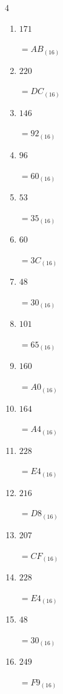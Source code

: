 \begin{multicols}{4}
\begin{enumerate}
        $=3A_{(16)}$

  \item $171$

        $=AB_{(16)}$

  \item $220$

        $=DC_{(16)}$

  \item $146$

        $=92_{(16)}$

\columnbreak %

  \item $96$

        $=60_{(16)}$

  \item $53$

        $=35_{(16)}$

  \item $60$

        $=3C_{(16)}$

  \item $48$

        $=30_{(16)}$

  \item $101$

        $=65_{(16)}$

  \item $160$

        $=A0_{(16)}$

  \item $164$

        $=A4_{(16)}$

  \item $228$

        $=E4_{(16)}$

  \item $216$

        $=D8_{(16)}$

  \item $207$

        $=CF_{(16)}$

  \item $228$

        $=E4_{(16)}$

  \item $48$

        $=30_{(16)}$

  \item $249$

        $=F9_{(16)}$


\end{enumerate}
\end{multicols}
